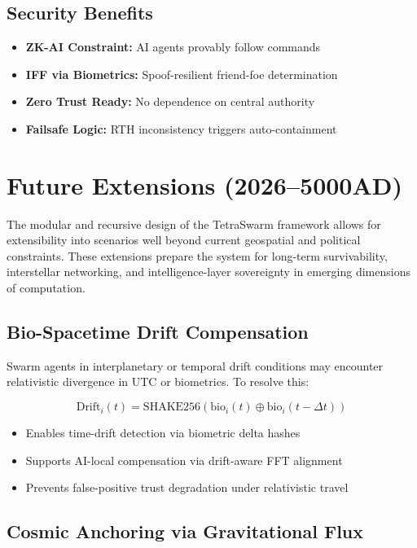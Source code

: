 \documentclass{article}
\begin{document}
\subsection*{Security Benefits}

\begin{itemize}
    \item \textbf{ZK-AI Constraint:} AI agents provably follow commands
    \item \textbf{IFF via Biometrics:} Spoof-resilient friend-foe determination
    \item \textbf{Zero Trust Ready:} No dependence on central authority
    \item \textbf{Failsafe Logic:} RTH inconsistency triggers auto-containment
\end{itemize}
\section*{Future Extensions (2026–5000AD)}

The modular and recursive design of the TetraSwarm framework allows for extensibility into scenarios well beyond current geospatial and political constraints. These extensions prepare the system for long-term survivability, interstellar networking, and intelligence-layer sovereignty in emerging dimensions of computation.

\subsection*{Bio-Spacetime Drift Compensation}

Swarm agents in interplanetary or temporal drift conditions may encounter relativistic divergence in UTC or biometrics. To resolve this:

\[
\text{Drift}_i(t) = \text{SHAKE256}(\text{bio}_i(t) \oplus \text{bio}_i(t - \Delta t))
\]

\begin{itemize}
    \item Enables time-drift detection via biometric delta hashes
    \item Supports AI-local compensation via drift-aware FFT alignment
    \item Prevents false-positive trust degradation under relativistic travel
\end{itemize}

\subsection*{Cosmic Anchoring via Gravitational Flux}
\end{document}
